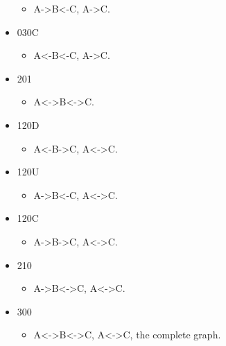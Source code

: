 \documentclass[]{article}
\providecommand{\tightlist}{%
  \setlength{\itemsep}{0pt}\setlength{\parskip}{0pt}}
\begin{document}
\begin{itemize}
  \begin{itemize}
  \tightlist
  \item
    A-\textgreater{}B\textless{}-C, A-\textgreater{}C.
  \end{itemize}
\item
  030C

  \begin{itemize}
  \tightlist
  \item
    A\textless{}-B\textless{}-C, A-\textgreater{}C.
  \end{itemize}
\item
  201

  \begin{itemize}
  \tightlist
  \item
    A\textless{}-\textgreater{}B\textless{}-\textgreater{}C.
  \end{itemize}
\item
  120D

  \begin{itemize}
  \tightlist
  \item
    A\textless{}-B-\textgreater{}C, A\textless{}-\textgreater{}C.
  \end{itemize}
\item
  120U

  \begin{itemize}
  \tightlist
  \item
    A-\textgreater{}B\textless{}-C, A\textless{}-\textgreater{}C.
  \end{itemize}
\item
  120C

  \begin{itemize}
  \tightlist
  \item
    A-\textgreater{}B-\textgreater{}C, A\textless{}-\textgreater{}C.
  \end{itemize}
\item
  210

  \begin{itemize}
  \tightlist
  \item
    A-\textgreater{}B\textless{}-\textgreater{}C,
    A\textless{}-\textgreater{}C.
  \end{itemize}
\item
  300

  \begin{itemize}
  \tightlist
  \item
    A\textless{}-\textgreater{}B\textless{}-\textgreater{}C,
    A\textless{}-\textgreater{}C, the complete graph.
  \end{itemize}
\end{itemize}
\end{document}
